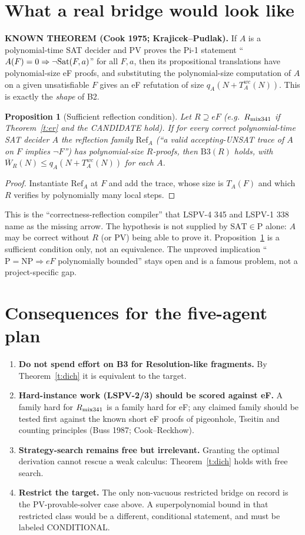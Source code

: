 \documentclass[11pt]{article}
\newtheorem{proposition}[theorem]{Proposition}
\begin{document}
\section{What a real bridge would look like}
\textbf{KNOWN THEOREM (Cook 1975; Krajicek--Pudlak).} If $A$ is a polynomial-time SAT decider and PV proves the Pi-1 statement ``$A(F)=0\Rightarrow\neg{\rm Sat}(F,a)$'' for all $F,a$, then its propositional translations have polynomial-size eF proofs, and substituting the polynomial-size computation of $A$ on a given unsatisfiable $F$ gives an eF refutation of size $q_A(N+T_A^{wc}(N))$. This is exactly the \emph{shape} of B2.

\begin{proposition}[Sufficient reflection condition]\label{p:ref}
Let $R\supseteq eF$ (e.g.\ $R_{\rm mix341}$ if Theorem~\ref{t:er} and the CANDIDATE hold). If for every correct polynomial-time SAT decider $A$ the reflection family $\mathrm{Ref}_A$ (``a valid accepting-UNSAT trace of $A$ on $F$ implies $\neg F$'') has polynomial-size $R$-proofs, then $\mathrm{B3}(R)$ holds, with $\overline W_R(N)\le q_A(N+T_A^{wc}(N))$ for each $A$.
\end{proposition}
\begin{proof} Instantiate $\mathrm{Ref}_A$ at $F$ and add the trace, whose size is $T_A(F)$ and which $R$ verifies by polynomially many local steps. \end{proof}
\noindent This is the ``correctness-reflection compiler'' that LSPV-4 345 and LSPV-1 338 name as the missing arrow. The hypothesis is not supplied by $\mathrm{SAT}\in\mathrm P$ alone: $A$ may be correct without $R$ (or PV) being able to prove it. Proposition~\ref{p:ref} is a sufficient condition only, not an equivalence. The unproved implication ``$\mathrm P=\mathrm{NP}\Rightarrow eF$ polynomially bounded'' stays open and is a famous problem, not a project-specific gap.

\section{Consequences for the five-agent plan}
\begin{enumerate}
\item \textbf{Do not spend effort on B3 for Resolution-like fragments.} By Theorem~\ref{t:dich} it is equivalent to the target.
\item \textbf{Hard-instance work (LSPV-2/3) should be scored against eF.} A family hard for $R_{\rm mix341}$ is a family hard for eF; any claimed family should be tested first against the known short eF proofs of pigeonhole, Tseitin and counting principles (Buss 1987; Cook--Reckhow).
\item \textbf{Strategy-search remains free but irrelevant.} Granting the optimal derivation cannot rescue a weak calculus: Theorem~\ref{t:dich} holds with free search.
\item \textbf{Restrict the target.} The only non-vacuous restricted bridge on record is the PV-provable-solver case above. A superpolynomial bound in that restricted class would be a different, conditional statement, and must be labeled CONDITIONAL.
\end{enumerate}
\end{document}
